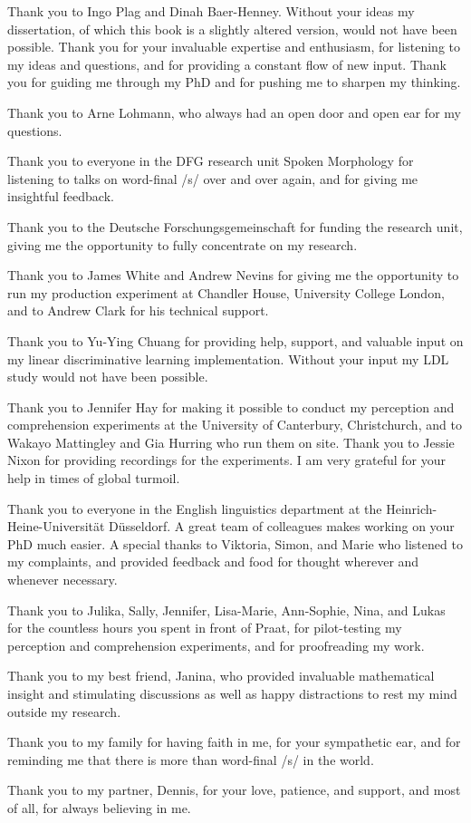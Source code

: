 \addchap{\lsAcknowledgementTitle} 

Thank you to Ingo Plag and Dinah Baer-Henney. Without your ideas my dissertation, of which this book is a slightly altered version, would not have been possible. Thank you for your invaluable expertise and enthusiasm, for listening to my ideas and questions, and for providing a constant flow of new input. Thank you for guiding me through my PhD and for pushing me to sharpen my thinking.

Thank you to Arne Lohmann, who always had an open door and open ear for my questions.

Thank you to everyone in the DFG research unit Spoken Morphology for listening to talks on word-final /s/ over and over again, and for giving me insightful feedback. 

Thank you to the Deutsche Forschungsgemeinschaft for funding the research unit, giving me the opportunity to fully concentrate on my research.

Thank you to James White and Andrew Nevins for giving me the opportunity to run my production experiment at Chandler House, University College London, and to Andrew Clark for his technical support.

Thank you to Yu-Ying Chuang for providing help, support, and valuable input on my linear discriminative learning implementation. Without your input my LDL study would not have been possible.

Thank you to Jennifer Hay for making it possible to conduct my perception and comprehension experiments at the University of Canterbury, Christchurch, and to Wakayo Mattingley and Gia Hurring who run them on site. Thank you to Jessie Nixon for providing recordings for the experiments. I am very grateful for your help in times of global turmoil.

Thank you to everyone in the English linguistics department at the Heinrich-Heine-Universität Düsseldorf. A great team of colleagues makes working on your PhD much easier. A special thanks to Viktoria, Simon, and Marie who listened to my complaints, and provided feedback and food for thought wherever and whenever necessary.

Thank you to Julika, Sally, Jennifer, Lisa-Marie, Ann-Sophie, Nina, and Lukas for the countless hours you spent in front of Praat, for pilot-testing my perception and comprehension experiments, and for proofreading my work.

Thank you to my best friend, Janina, who provided invaluable mathematical insight and stimulating discussions as well as happy distractions to rest my mind outside my research.

Thank you to my family for having faith in me, for your sympathetic ear, and for reminding me that there is more than word-final /s/ in the world.

Thank you to my partner, Dennis, for your love, patience, and support, and most of all, for always believing in me.


